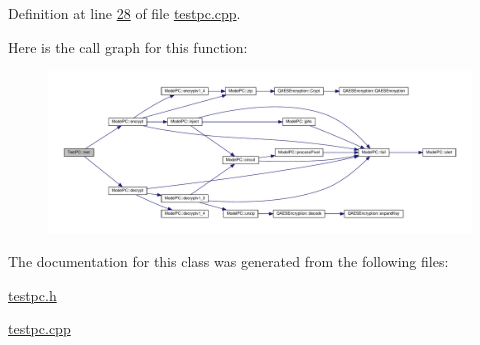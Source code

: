 Definition at line \hyperlink{testpc_8cpp_source_l00028}{28} of file \hyperlink{testpc_8cpp_source}{testpc.\-cpp}.



Here is the call graph for this function\-:
\nopagebreak
\begin{figure}[H]
\begin{center}
\leavevmode
\includegraphics[width=350pt]{class_test_p_c_a612a0409006417c6f03e1749bca0d45a_cgraph}
\end{center}
\end{figure}




The documentation for this class was generated from the following files\-:\begin{DoxyCompactItemize}
\item 
\hyperlink{testpc_8h}{testpc.\-h}\item 
\hyperlink{testpc_8cpp}{testpc.\-cpp}\end{DoxyCompactItemize}
